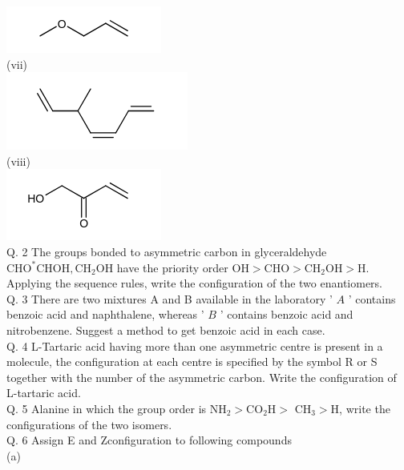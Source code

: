 \documentclass[10pt]{article}
\begin{document}
\includegraphics{smile-ed6628f9f75cc83d184b29122e7ed4dc7c8475bc}\\
(vii)\\
\includegraphics{smile-63a823da46d545d7c97a77f745e7c3d1de73c921}\\
(viii)\\
\includegraphics{smile-0bb73320cf3f8b3f320a759f7534e499629fd789}\\
Q. 2 The groups bonded to asymmetric carbon in glyceraldehyde $\mathrm{CHO}^{*} \mathrm{CHOH}, \mathrm{CH}_{2} \mathrm{OH}$ have the priority order $\mathrm{OH}>\mathrm{CHO}>\mathrm{CH}_{2} \mathrm{OH}>\mathrm{H}$. Applying the sequence rules, write the configuration of the two enantiomers.\\
Q. 3 There are two mixtures A and B available in the laboratory ' $A$ ' contains benzoic acid and naphthalene, whereas ' $B$ ' contains benzoic acid and nitrobenzene. Suggest a method to get benzoic acid in each case.\\
Q. 4 L-Tartaric acid having more than one asymmetric centre is present in a molecule, the configuration at each centre is specified by the symbol R or S together with the number of the asymmetric carbon. Write the configuration of L-tartaric acid.\\
Q. 5 Alanine in which the group order is $\mathrm{NH}_{2}>\mathrm{CO}_{2} \mathrm{H}>$ $\mathrm{CH}_{3}>\mathrm{H}$, write the configurations of the two isomers.\\
Q. 6 Assign E and Zconfiguration to following compounds\\
(a)\\
\end{document}
